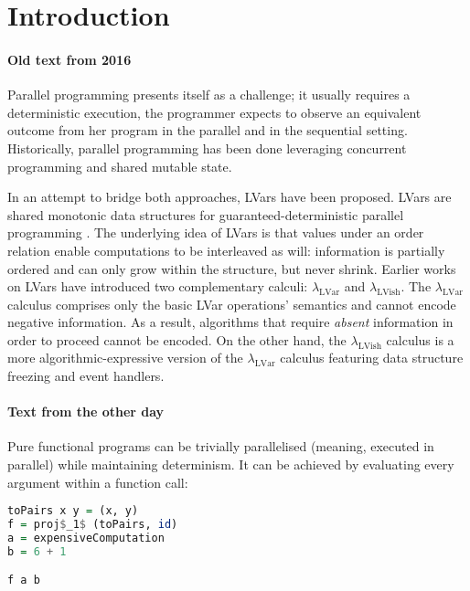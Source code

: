 \documentclass[main.tex]{subfiles}
\begin{document}
\section{Introduction}


\paragraph{Old text from 2016}
Parallel programming presents itself as a challenge; it usually
requires a deterministic execution, \ie the programmer expects to observe an equivalent
outcome from her program in the parallel and in the sequential setting.
Historically, parallel programming has been done leveraging concurrent
programming and shared mutable state.

In an attempt to bridge both approaches, LVars have been proposed.
LVars are shared monotonic data structures for
guaranteed-deterministic parallel programming \cite{kuper15}. The underlying idea
of LVars is that values under an order relation enable computations to be interleaved as will:
information is partially ordered and can only grow
within the structure, but never shrink. Earlier works
on LVars have introduced two complementary calculi: $\lambda_{\text{LVar}}$ and
$\lambda_{\text{LVish}}$. The $\lambda_{\text{LVar}}$ calculus comprises only the
basic LVar operations' semantics and cannot encode negative information. As a
result, algorithms that require \textit{absent} information in order to proceed cannot
be encoded. On the other hand, the $\lambda_{\text{LVish}}$ calculus is a more
algorithmic-expressive version of the
$\lambda_{\text{LVar}}$ calculus featuring data structure freezing and event
handlers.

\paragraph{Text from the other day}
Pure functional programs can be trivially parallelised (meaning, executed in parallel) while maintaining determinism. It can be achieved by evaluating every argument within a function call:

\begin{lstlisting}[language=Haskell]
toPairs x y = (x, y)
f = proj$_1$ (toPairs, id)
a = expensiveComputation
b = 6 + 1

f a b
\end{lstlisting}
\end{document}
